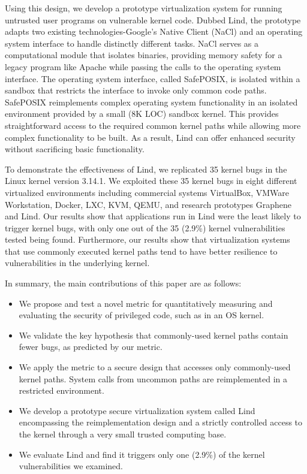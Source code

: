 Using this design, we develop a prototype virtualization system for
running untrusted user programs on vulnerable kernel code. Dubbed Lind, the
prototype adapts two existing technologies-Google's Native Client (NaCl) and
an operating system interface
to handle distinctly different tasks. NaCl serves as a computational
module that isolates binaries, providing memory safety for a legacy program like
Apache while passing the calls to the operating system interface.  
The operating system interface, called SafePOSIX,
is isolated within a sandbox that restricts the interface to invoke only common code paths.
SafePOSIX reimplements complex operating system functionality in an isolated
environment provided by a small (8K LOC) sandbox kernel. This provides
straightforward access to the required common kernel paths while allowing more
complex functionality to be built.
As a result, Lind can offer enhanced security without sacrificing basic functionality.

To demonstrate the effectiveness of Lind, we replicated 35 kernel bugs in the Linux kernel
version 3.14.1. We exploited these 35 kernel bugs %
in eight different virtualized environments including
commercial systems VirtualBox, VMWare Workstation, Docker, LXC,
KVM, QEMU, and research prototypes Graphene and Lind. Our results show
that applications run in Lind were the least likely to trigger kernel bugs,
with only one out of the 35 (2.9\%) kernel vulnerabilities tested being found.
Furthermore, our results show that virtualization systems that use commonly 
executed kernel paths tend to have better resilience to vulnerabilities
in the underlying kernel.  

In summary, the main contributions of this paper are as follows:

\begin{itemize}\setlength\itemsep{0em}
\item
We propose and test a novel metric for quantitatively measuring and evaluating
the security of privileged code, such as in an OS kernel.

\item
We validate the key hypothesis that commonly-used kernel paths contain fewer bugs,
as predicted by our metric.

\item
We apply the metric to a secure design that accesses only commonly-used
kernel paths. System calls from uncommon paths are reimplemented in a
restricted environment.

\item
We develop a prototype secure virtualization system called Lind encompassing
the reimplementation design and a strictly controlled access to the kernel
through a very small trusted computing base.

\item
We evaluate Lind and find it triggers only one (2.9\%) of the kernel vulnerabilities
we examined.
\end{itemize}

